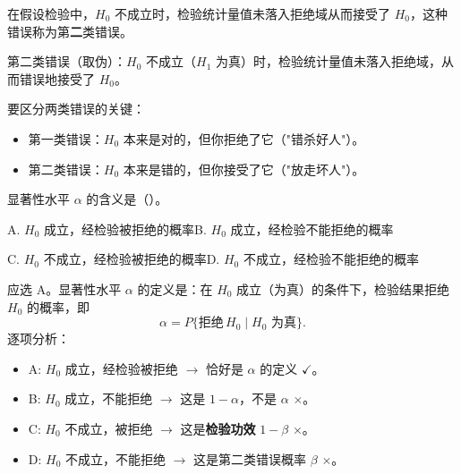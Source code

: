 \documentclass[lang=cn,11pt]{elegantbook}
\begin{document}
\begin{exercise}\label{exer:9-error-concept1}
在假设检验中，\(H_0\) 不成立时，检验统计量值未落入拒绝域从而接受了 \(H_0\)，这种错误称为第\textbf{二}类错误。
\end{exercise}
\begin{solution}
第二类错误（取伪）：\(H_0\) 不成立（\(H_1\) 为真）时，检验统计量值未落入拒绝域，从而错误地接受了 \(H_0\)。
\begin{note}
要区分两类错误的关键：
\begin{itemize}
    \item 第一类错误：\(H_0\) 本来是对的，但你拒绝了它（"错杀好人"）。
    \item 第二类错误：\(H_0\) 本来是错的，但你接受了它（"放走坏人"）。
\end{itemize}
\end{note}
\end{solution}


\begin{exercise}\label{exer:9-error-concept2}
显著性水平 \(\alpha\) 的含义是（\quad）。\par
A. \(H_0\) 成立，经检验被拒绝的概率\qquad B. \(H_0\) 成立，经检验不能拒绝的概率\par
C. \(H_0\) 不成立，经检验被拒绝的概率\qquad D. \(H_0\) 不成立，经检验不能拒绝的概率
\end{exercise}
\begin{solution}
应选 A。显著性水平 \(\alpha\) 的定义是：在 \(H_0\) 成立（为真）的条件下，检验结果拒绝 \(H_0\) 的概率，即
\[
\alpha = P\{\text{拒绝}\,H_0 \mid H_0\text{ 为真}\}.
\]
逐项分析：
\begin{itemize}
    \item A: \(H_0\) 成立，经检验被拒绝 \(\longrightarrow\) 恰好是 \(\alpha\) 的定义 \(\checkmark\)。
    \item B: \(H_0\) 成立，不能拒绝 \(\longrightarrow\) 这是 \(1-\alpha\)，不是 \(\alpha\) \(\times\)。
    \item C: \(H_0\) 不成立，被拒绝 \(\longrightarrow\) 这是\textbf{检验功效} \(1-\beta\) \(\times\)。
    \item D: \(H_0\) 不成立，不能拒绝 \(\longrightarrow\) 这是第二类错误概率 \(\beta\) \(\times\)。
\end{itemize}
\end{solution}
\end{document}
